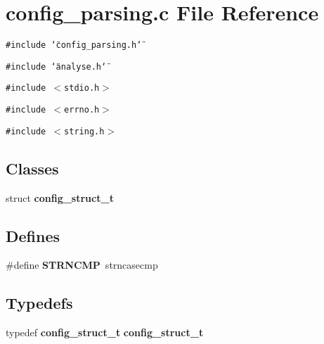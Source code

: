 \section{config\_\-parsing.c File Reference}
\label{config__parsing_8c}
{\tt \#include \char`\"{}config\_\-parsing.h\char`\"{}}\par
{\tt \#include \char`\"{}analyse.h\char`\"{}}\par
{\tt \#include $<$stdio.h$>$}\par
{\tt \#include $<$errno.h$>$}\par
{\tt \#include $<$string.h$>$}\par
\subsection*{Classes}
\begin{CompactItemize}
\item 
struct {\bf config\_\-struct\_\-t}
\end{CompactItemize}
\subsection*{Defines}
\begin{CompactItemize}
\item 
\#define {\bf STRNCMP}\ strncasecmp
\end{CompactItemize}
\subsection*{Typedefs}
\begin{CompactItemize}
\item 
typedef {\bf config\_\-struct\_\-t} {\bf config\_\-struct\_\-t}
\end{CompactItemize}

